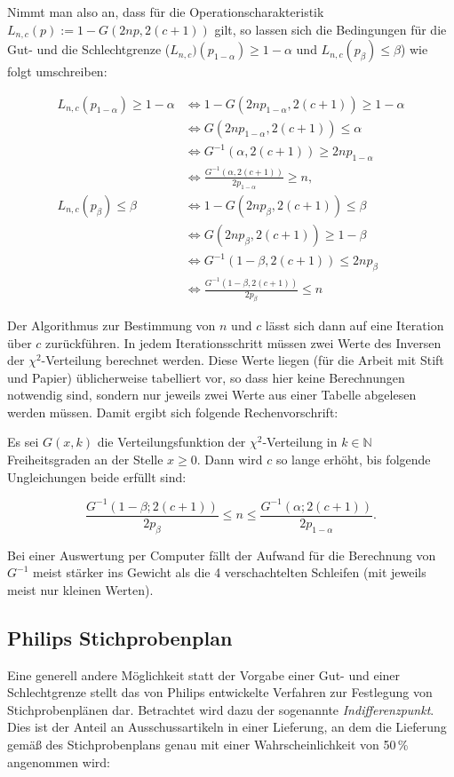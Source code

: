 \documentclass[a4paper,11pt,oneside]{article}
\begin{document}
Nimmt man also an, dass für die Operationscharakteristik $L_{n,c}(p):=1-G(2np,2(c+1))$ gilt, so lassen sich die Bedingungen für die Gut- und die Schlechtgrenze ($L_{n,c})(p_{1-\alpha})\ge1-\alpha$ und $L_{n,c}(p_\beta)\le\beta$) wie folgt umschreiben:

\begin{align*}
L_{n,c}(p_{1-\alpha}) \ge 1-\alpha
&\iff 1-G(2np_{1-\alpha},2(c+1))\ge1-\alpha\\
&\iff G(2np_{1-\alpha},2(c+1)) \le\alpha\\
&\iff G^{-1}(\alpha,2(c+1))\ge2np_{1-\alpha}\\
&\iff \frac{G^{-1}(\alpha,2(c+1))}{2p_{1-\alpha}}\ge n,\\[2ex]
L_{n,c}(p_\beta)\le\beta
&\iff 1-G(2np_\beta,2(c+1))\le\beta\\
&\iff G(2np_\beta,2(c+1))\ge1-\beta\\
&\iff G^{-1}(1-\beta,2(c+1))\le2np_\beta\\
&\iff \frac{G^{-1}(1-\beta,2(c+1))}{2p_\beta}\le n
\end{align*}

Der Algorithmus zur Bestimmung von $n$ und $c$ lässt sich dann auf eine Iteration über $c$ zurückführen. In jedem Iterationsschritt müssen zwei Werte des Inversen der $\chi^2$-Verteilung berechnet werden. Diese Werte liegen (für die Arbeit mit Stift und Papier) üblicherweise tabelliert vor, so dass hier keine Berechnungen notwendig sind, sondern nur jeweils zwei Werte aus einer Tabelle abgelesen werden müssen. Damit ergibt sich folgende Rechenvorschrift:

Es sei $G(x,k)$ die Verteilungsfunktion der $\chi^2$-Verteilung in $k\in\mathbb N$ Freiheitsgraden an der Stelle $x\ge0$. Dann wird $c$ so lange erhöht, bis folgende Ungleichungen beide erfüllt sind:

$$
\frac{G^{-1}(1-\beta;2(c+1))}{2p_\beta}\le n\le\frac{G^{-1}(\alpha;2(c+1))}{2p_{1-\alpha}}.
$$

Bei einer Auswertung per Computer fällt der Aufwand für die Berechnung von $G^{-1}$ meist stärker ins Gewicht als die 4 verschachtelten Schleifen (mit jeweils meist nur kleinen Werten).

\subsection{Philips Stichprobenplan}

Eine generell andere Möglichkeit statt der Vorgabe einer Gut- und einer Schlechtgrenze stellt das von Philips entwickelte Verfahren zur Festlegung von Stichprobenplänen dar. Betrachtet wird dazu der sogenannte \emph{Indifferenzpunkt}. Dies ist der Anteil an Ausschussartikeln in einer Lieferung, an dem die Lieferung gemäß des Stichprobenplans genau mit einer Wahrscheinlichkeit von 50\,\% angenommen wird:
\end{document}
